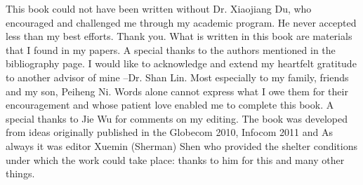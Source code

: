 
This book could not have been written without Dr. Xiaojiang Du, who
encouraged and challenged me through my academic program. He never
accepted less than my best efforts. Thank you. What is written in
this book are materials that I found in my papers. A
special thanks to the authors mentioned in the bibliography page. I
would like to acknowledge and extend my heartfelt gratitude to another advisor
of mine --Dr. Shan Lin. Most especially to my family,
friends and my son, Peiheng Ni. Words alone cannot express what I
owe them for their encouragement and whose patient love enabled me
to complete this book. A special thanks to Jie Wu for comments on my
editing. The book was developed from ideas originally published in the Globecom 2010, Infocom 2011 and %
As always it was editor Xuemin (Sherman) Shen who provided the shelter conditions under which the work could take place: thanks to him
for this and many other things.

